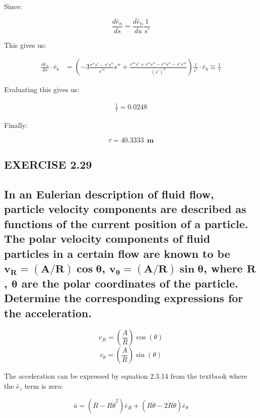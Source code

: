 \documentclass[12pt, letterpaper]{../assignment}
\begin{document}
Since:

$$ \frac{d \bar{e}_n}{d s} = \frac{d \bar{e}_n}{d u} \frac{1}{s'} $$

This gives us:

\begin{equation*}
    \begin{aligned}
    \frac{d \bar{e}_n}{d s} \cdot \bar{e}_b
    &= \left(-3\frac{r'' s' - r's''}{{s'}^4}{s''}
    + \frac{r''' s' + r''s'' - r''s'' - r's'''}{(s')^3}\right)\frac{1}{s'} \cdot \bar{e}_b \equiv \frac{1}{\tau}
    \end{aligned}
\end{equation*}

Evaluating this gives us:

\begin{equation*}
    \begin{aligned}
    \frac{1}{\tau} = 0.0248
    \end{aligned}
\end{equation*}

Finally:

\begin{answer}
$$ \tau = 40.3333 \ \ \textbf{m} $$
\end{answer}

\subsection*{EXERCISE 2.29}
\subsection*{In an Eulerian description of fluid flow,
particle velocity components are described as functions of the current position of a particle.
The polar velocity components of fluid particles in a certain flow are known to be $\bm{v_R = (A/R)\cos\theta}$,
$\bm{v_\theta = (A/R)\sin\theta}$, where $\bm{R}$, $\bm{\theta}    $ are the polar coordinates of the particle.
Determine the corresponding expressions for the acceleration.}

$$ v_R      = \left(\frac{A}{R}\right)\cos(\theta) $$
$$ v_\theta = \left(\frac{A}{R}\right)\sin(\theta) $$

The acceleration can be expressed by equation 2.3.14 from the textbook where the $\bar{e}_z$ term is zero:

$$ \bar{a} = \left( \ddot{R} - R \dot{\theta}^2 \right) \bar{e}_R +
\left( R \ddot{\theta} - 2 \dot{R} \dot{\theta} \right) \bar{e}_\theta $$
\end{document}
